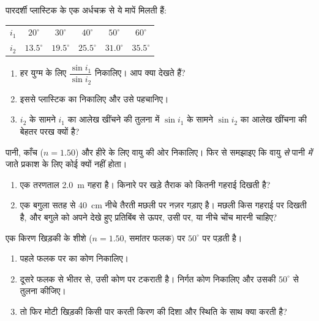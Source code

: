 \begin{exercise}[$\star\star$]\label{exo:g10:refraction:6}
पारदर्शी प्लास्टिक के एक अर्धचक्र से ये मापें मिलती हैं:
\begin{center}
\begin{tabular}{lccccc}
$i_1$ & $20^\circ$ & $30^\circ$ & $40^\circ$ & $50^\circ$ & $60^\circ$ \\
$i_2$ & $13.5^\circ$ & $19.5^\circ$ & $25.5^\circ$ & $31.0^\circ$
      & $35.5^\circ$ \\
\end{tabular}
\end{center}
\begin{enumerate}
  \item हर युग्म के लिए $\dfrac{\sin i_1}{\sin i_2}$ निकालिए। आप क्या देखते हैं?
  \item इससे प्लास्टिक का  निकालिए और उसे पहचानिए।
  \item $i_2$ के सामने $i_1$ का आलेख खींचने की तुलना में $\sin i_1$
        के सामने $\sin i_2$ का आलेख खींचना  की बेहतर
        परख क्यों है?
\end{enumerate}
\end{exercise}

\begin{exercise}[$\star\star$]\label{exo:g10:refraction:7}
पानी, काँच ($n = 1.50$) और हीरे के लिए वायु की ओर 
निकालिए। फिर  से समझाइए कि वायु \emph{से} पानी
\emph{में} जाते प्रकाश के लिए कोई  क्यों नहीं होता।
\end{exercise}

\begin{exercise}[$\star\star$]\label{exo:g10:refraction:8}
\begin{enumerate}
  \item एक तरणताल \qty{2.0}{m} गहरा है। किनारे पर खड़े तैराक को कितनी गहराई
        दिखती है?
  \item एक बगुला सतह से \qty{40}{cm} नीचे तैरती मछली पर नज़र गड़ाए है। मछली
        किस गहराई पर दिखती है, और बगुले को अपने देखे हुए प्रतिबिंब से
        ऊपर, उसी पर, या नीचे चोंच मारनी चाहिए?
\end{enumerate}
\end{exercise}

\begin{exercise}[$\star\star$]\label{exo:g10:refraction:9}
एक किरण खिड़की के शीशे ($n = 1.50$, समांतर फलक) पर $50^\circ$ पर पड़ती है।
\begin{enumerate}
  \item पहले फलक पर  का कोण निकालिए।
  \item {} दूसरे फलक से भीतर से, उसी कोण पर टकराती
        है। निर्गत कोण निकालिए और उसकी $50^\circ$ से तुलना कीजिए।
  \item तो फिर मोटी खिड़की किसी पार करती किरण की दिशा और स्थिति के साथ
        क्या करती है?
\end{enumerate}
\end{exercise}


